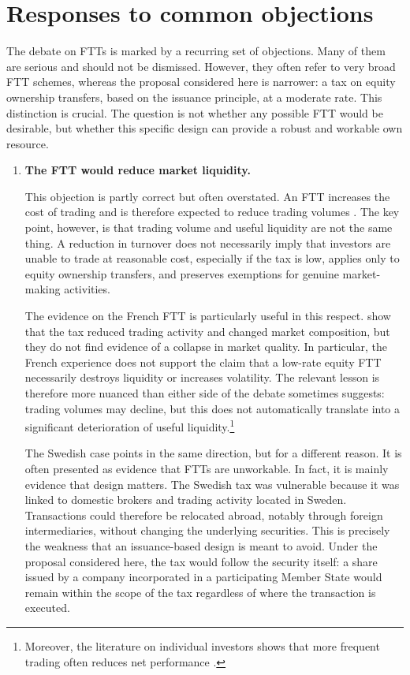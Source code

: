 \documentclass[../../main]{subfiles}
\begin{document}
\newpage


\section{Responses to common objections}

The debate on FTTs is marked by a recurring set of objections. Many of them are serious and should not be dismissed. However, they often refer to very broad FTT schemes, whereas the proposal considered here is narrower: a tax on equity ownership transfers, based on the issuance principle, at a moderate rate. This distinction is crucial. The question is not whether any possible FTT would be desirable, but whether this specific design can provide a robust and workable own resource.


\begin{enumerate}

    \item \textbf{The FTT would reduce market liquidity.}

This objection is partly correct but often overstated. An FTT increases the cost of trading and is therefore expected to reduce trading volumes \citep{IMF2010}. The key point, however, is that trading volume and useful liquidity are not the same thing. A reduction in turnover does not necessarily imply that investors are unable to trade at reasonable cost, especially if the tax is low, applies only to equity ownership transfers, and preserves exemptions for genuine market-making activities.

The evidence on the French FTT is particularly useful in this respect. \cite{ColliardHoffmann2017} show that the tax reduced trading activity and changed market composition, but they do not find evidence of a collapse in market quality. In particular, the French experience does not support the claim that a low-rate equity FTT necessarily destroys liquidity or increases volatility. The relevant lesson is therefore more nuanced than either side of the debate sometimes suggests: trading volumes may decline, but this does not automatically translate into a significant deterioration of useful liquidity.\footnote{Moreover, the literature on individual investors  shows that more frequent trading often reduces net performance \citep{DeBondtThaler1995, Shleifer2000,Odean1999,BarberOdean2000, BarberOdean2001}.}

The Swedish case points in the same direction, but for a different reason. It is often presented as evidence that FTTs are unworkable. In fact, it is mainly evidence that design matters. The Swedish tax was vulnerable because it was linked to domestic brokers and trading activity located in Sweden. Transactions could therefore be relocated abroad, notably through foreign intermediaries, without changing the underlying securities. This is precisely the weakness that an issuance-based design is meant to avoid. Under the proposal considered here, the tax would follow the security itself: a share issued by a company incorporated in a participating Member State would remain within the scope of the tax regardless of where the transaction is executed.


\end{enumerate}
\end{document}
